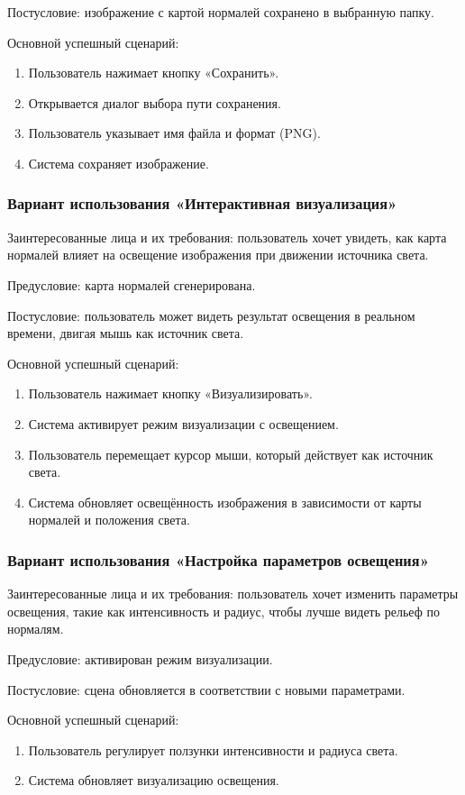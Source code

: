 Постусловие: изображение с картой нормалей сохранено в выбранную папку.

Основной успешный сценарий:
\begin{enumerate}
	\item Пользователь нажимает кнопку «Сохранить».
	\item Открывается диалог выбора пути сохранения.
	\item Пользователь указывает имя файла и формат (PNG).
	\item Система сохраняет изображение.
\end{enumerate}
\subsubsection{Вариант использования «Интерактивная визуализация»}

Заинтересованные лица и их требования: пользователь хочет увидеть, как карта нормалей влияет на освещение изображения при движении источника света.

Предусловие: карта нормалей сгенерирована.

Постусловие: пользователь может видеть результат освещения в реальном времени, двигая мышь как источник света.

Основной успешный сценарий:
\begin{enumerate}
	\item Пользователь нажимает кнопку «Визуализировать».
	\item Система активирует режим визуализации с освещением.
	\item Пользователь перемещает курсор мыши, который действует как источник света.
	\item Система обновляет освещённость изображения в зависимости от карты нормалей и положения света.
\end{enumerate}
\subsubsection{Вариант использования «Настройка параметров освещения»}

Заинтересованные лица и их требования: пользователь хочет изменить параметры освещения, такие как интенсивность и радиус, чтобы лучше видеть рельеф по нормалям.

Предусловие: активирован режим визуализации.

Постусловие: сцена обновляется в соответствии с новыми параметрами.

Основной успешный сценарий:
\begin{enumerate}
	\item Пользователь регулирует ползунки интенсивности и радиуса света.
	\item Система обновляет визуализацию освещения.
\end{enumerate}
